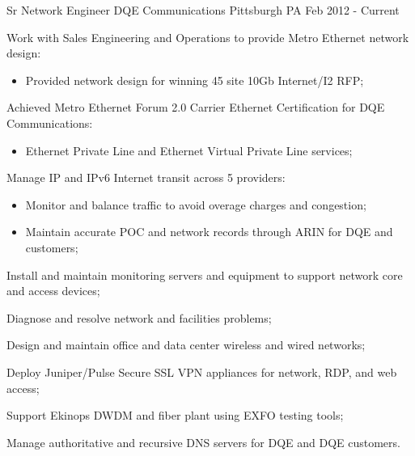 


\begin{cventries}


\cventry
{Sr Network Engineer} %
{DQE Communications} %
{Pittsburgh PA} %
{Feb 2012 - Current} %
{ %
\begin{cvitems}
\item Work with Sales Engineering and Operations to provide Metro Ethernet network design:
  \begin{itemize}%
  \item Provided network design for winning 45 site 10Gb Internet/I2 RFP;
  \end{itemize}
\item Achieved Metro Ethernet Forum 2.0 Carrier Ethernet Certification for DQE Communications:
  \begin{itemize}%
  \item Ethernet Private Line and Ethernet Virtual Private Line services;
  \end{itemize}
\item Manage IP and IPv6 Internet transit across 5 providers:
  \begin{itemize}%
  \item Monitor and balance traffic to avoid overage charges and congestion;
  \item Maintain accurate POC and network records through ARIN for DQE and customers;
  \end{itemize}
\item Install and maintain monitoring servers and equipment to support network core and access devices;
\item Diagnose and resolve network and facilities problems;
\item Design and maintain office and data center wireless and wired networks;
\item Deploy Juniper/Pulse Secure SSL VPN appliances for network, RDP, and web access;
\item Support Ekinops DWDM and fiber plant using EXFO testing tools;
\item Manage authoritative and recursive DNS servers for DQE and DQE customers.
\end{cvitems}
}


\end{cventries}
